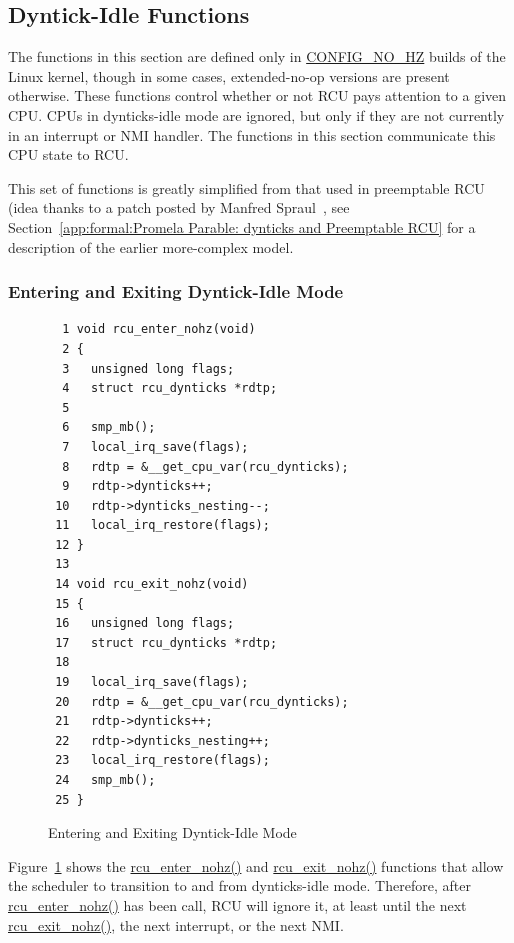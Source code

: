 \subsection{Dyntick-Idle Functions}
\label{app:rcuimpl:rcutreewt:Dyntick-Idle Functions}

The functions in this section are defined only in \url{CONFIG_NO_HZ}
builds of the Linux kernel,
though in some cases, extended-no-op versions are present otherwise.
These functions control whether or not RCU pays attention to a given CPU.
CPUs in dynticks-idle mode are ignored, but only if they are not
currently in an interrupt or NMI handler.
The functions in this section communicate this CPU state to RCU.

This set of functions is greatly simplified from that used in
preemptable RCU (idea thanks to a patch posted by
Manfred Spraul~\cite{ManfredSpraul2008StateMachineRCU},
see
Section~\ref{app:formal:Promela Parable: dynticks and Preemptable RCU}
for a description of the earlier more-complex model.

\subsubsection{Entering and Exiting Dyntick-Idle Mode}
\label{app:rcuimpl:rcutreewt:Entering and Exiting Dyntick-Idle Mode}

\begin{figure}[tbp]
{ \scriptsize
\begin{verbatim}
  1 void rcu_enter_nohz(void)
  2 {
  3   unsigned long flags;
  4   struct rcu_dynticks *rdtp;
  5 
  6   smp_mb();
  7   local_irq_save(flags);
  8   rdtp = &__get_cpu_var(rcu_dynticks);
  9   rdtp->dynticks++;
 10   rdtp->dynticks_nesting--;
 11   local_irq_restore(flags);
 12 }
 13 
 14 void rcu_exit_nohz(void)
 15 {
 16   unsigned long flags;
 17   struct rcu_dynticks *rdtp;
 18 
 19   local_irq_save(flags);
 20   rdtp = &__get_cpu_var(rcu_dynticks);
 21   rdtp->dynticks++;
 22   rdtp->dynticks_nesting++;
 23   local_irq_restore(flags);
 24   smp_mb();
 25 }
\end{verbatim}
}
\caption{Entering and Exiting Dyntick-Idle Mode}
\label{fig:app:rcuimpl:rcutreewt:Entering and Exiting Dyntick-Idle Mode}
\end{figure}

Figure~\ref{fig:app:rcuimpl:rcutreewt:Entering and Exiting Dyntick-Idle Mode}
shows the \url{rcu_enter_nohz()} and \url{rcu_exit_nohz()} functions
that allow the scheduler to transition to and from dynticks-idle
mode.
Therefore, after \url{rcu_enter_nohz()} has been call, RCU will ignore
it, at least until the next \url{rcu_exit_nohz()}, the next interrupt,
or the next NMI.

